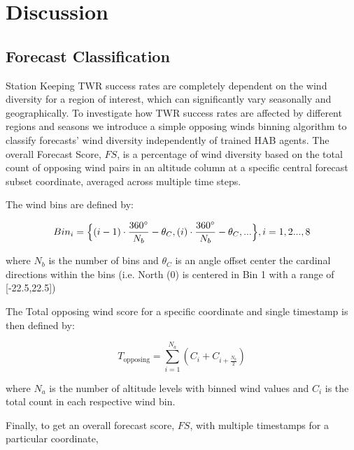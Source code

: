 \section{Discussion}\label{section:Discussion}


\subsection{Forecast Classification}\label{section:Discussion_ForecastClassification}

Station Keeping TWR success rates are completely dependent on the wind diversity for a region of interest, which can significantly vary seasonally and geographically.  To investigate how TWR success rates are affected by different regions and seasons we introduce a simple opposing winds binning algorithm to classify forecasts' wind diversity independently of trained HAB agents. The overall Forecast Score, $FS$, is a percentage of wind diversity based on the total count of opposing wind pairs in an altitude column at a specific central forecast subset coordinate, averaged across multiple time steps.



The wind bins are defined by:  

\begin{equation}
Bin_i = \Bigl\{(i-1)\cdot \frac{360\degree}{N_b}-\theta_{C}, 
(i)\cdot \frac{360\degree}{N_b}-\theta_{C},
\mathrm{...}
\Bigr\} , i = 1,2...,8
\end{equation}

where $N_b$ is the number of bins and $\theta_C$ is an angle offset center the cardinal directions within the bins (i.e. North (0\degree) is centered in Bin 1 with a range of [-22.5\degree,22.5\degree])


The Total opposing wind score for a specific coordinate and single timestamp is then defined by:

\begin{equation}
T_{\mathrm{opposing}} = \sum_{i=1}^{N_a}(C_i+C_{i+\frac{N_b}{2}})
\end{equation}

where $N_a$ is the number of altitude levels with binned wind values and $C_i$ is the total count in each respective wind bin. 

Finally, to get an overall forecast score, $FS$, with multiple timestamps for a particular coordinate,

